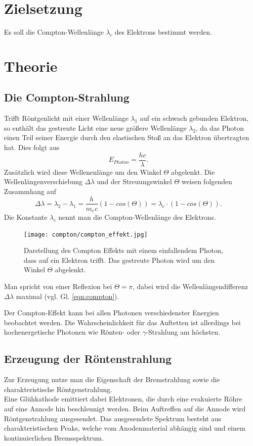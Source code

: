 \newpage
\section*{Zielsetzung}
Es soll die Compton-Wellenlänge $\lambda_c$ des Elektrons bestimmt werden.
\section{Theorie}
\subsection{Die Compton-Strahlung}
\label{sec:theorie}
Trifft Röntgenlicht mit einer Wellenlänge $\lambda_1$ auf ein schwach gebunden Elektron, so enthält das gestreute Licht eine neue 
größere Wellenlänge $\lambda_2$, da das Photon einen Teil seiner Energie durch den elastischen Stoß
an das Elektron übertragten hat. 
Dies folgt aus 
\begin{equation}
    E_{Photon}=\frac{hc}{\lambda}.
    \label{eqn:energie}
\end{equation}
Zusätzlich wird diese Wellenenlänge um den Winkel $\Theta$ abgelenkt.
Die Wellenlängenverschiebung $\Delta \lambda$ und der Streuungswinkel 
$\Theta$ weisen folgenden Zusammhang auf
\begin{equation}
    \Delta \lambda = \lambda_2 - \lambda_1 =\frac{h}{m_e c}\left(1-cos(\Theta)\right)=\lambda_c \cdot \left(1-cos(\Theta)\right).
    \label{eqn:compton}
\end{equation}
Die Konstante $\lambda_c$ nennt man die Compton-Wellenlänge des Elektrons.
\begin{figure}[H]
    \centering
    \texttt{[image: compton/compton\_effekt.jpg]}
    \caption{Darstellung des Compton Effekts mit einem einfallendem Photon, dass
    auf ein Elektron trifft. Das gestreute Photon wird um den Winkel $\Theta$
    abgelenkt.\cite[1]{anleitung}}
\end{figure}
Man spricht von einer Reflexion bei $\Theta=\pi$, dabei wird die Wellenlängendifferenz
$\Delta \lambda$ maximal (vgl. Gl. \ref{eqn:compton}).

Der Compton-Effekt kann bei allen Photonen verschiedenster Energien beobachtet werden.
Die Wahrscheinlichkeit für das Auftetten ist allerdings bei hochenergetische Photonen wie
Rönten- oder $\gamma$-Strahlung am höchsten.
\newpage
\subsection{Erzeugung der Röntenstrahlung}
Zur Erzeugung nutze man die Eigenschaft der Bremstrahlung sowie die charakteristische
Röntgenstrahlung.\\ 
Eine Glühkathode emittiert dabei Elektronen, die durch eine evakuierte Röhre auf 
eine Annode hin beschleunigt werden. 
Beim Auftreffen auf die Annode wird Röntgenstrahlung ausgesendet.
Das ausgesendete Spektrum besteht aus charakteristischen Peaks, welche vom
Anodenmaterial abhängig sind und einem kontinuierlichen Bremsspektrum.

